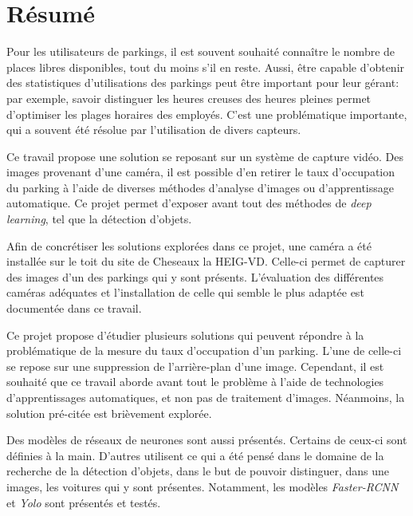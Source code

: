 \chapter{Résumé}

Pour les utilisateurs de parkings, il est souvent souhaité connaître le nombre de places libres disponibles, tout du moins s'il en reste. Aussi, être capable d'obtenir des statistiques d'utilisations des parkings peut être important pour leur gérant: par exemple, savoir distinguer les heures creuses des heures pleines permet d'optimiser les plages horaires des employés. C'est une problématique importante, qui a souvent été résolue par l'utilisation de divers capteurs. 

Ce travail propose une solution se reposant sur un système de capture vidéo. Des images provenant d'une caméra, il est possible d'en retirer le taux d'occupation du parking à l'aide de diverses méthodes d'analyse d'images ou d'apprentissage automatique. Ce projet permet d'exposer avant tout des méthodes de \textit{deep learning}, tel que la détection d'objets. 

Afin de concrétiser les solutions explorées dans ce projet, une caméra a été  installée sur le toit du site de Cheseaux la HEIG-VD. Celle-ci permet de capturer des images d'un des parkings qui y sont présents. L'évaluation des différentes caméras adéquates et l'installation de celle qui semble le plus adaptée est documentée dans ce travail. 

Ce projet propose d'étudier plusieurs solutions qui peuvent répondre à la problématique de la mesure du taux d'occupation d'un parking. L'une de celle-ci se repose sur une suppression de l'arrière-plan d'une image. Cependant, il est souhaité que ce travail aborde avant tout le problème à l'aide de technologies d'apprentissages automatiques, et non pas de traitement d'images. Néanmoins, la solution pré-citée est brièvement explorée.

Des modèles de réseaux de neurones sont aussi présentés. Certains de ceux-ci sont définies à la main. D'autres utilisent ce qui a été pensé dans le domaine de la recherche de la détection d'objets, dans le but de pouvoir distinguer, dans une images, les voitures qui y sont présentes. Notamment, les modèles \textit{Faster-RCNN} et \textit{Yolo} sont présentés et testés.
